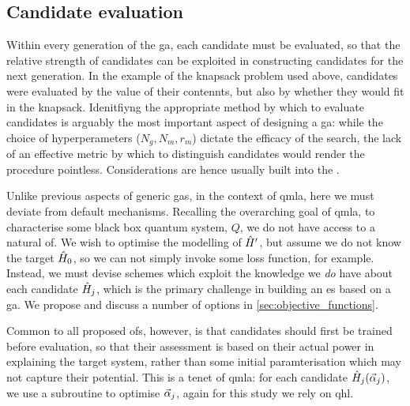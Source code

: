 \subsection{Candidate evaluation}
\label{sec:candidate_evaluation}
Within every generation of the \gls{ga}, each candidate must be evaluated, 
    so that the relative strength of candidates can be exploited in constructing 
    candidates for the next generation.
In the example of the knapsack problem used above, candidates were evaluated by the value of their contennts, 
    but also by whether they would fit in the knapsack. 
Idenitfiyng the appropriate method by which to evaluate candidates is arguably the most important aspect of designing a \gls{ga}:
    while the choice of hyperperameters ($N_g, N_m, r_m$) dictate the efficacy of the search, 
    the lack of an effective metric by which to distinguish candidates would render the procedure pointless.
Considerations are hence usually built into the . 
\par 
Unlike previous aspects of generic \glspl{ga}, in the context of \gls{qmla}, here we must deviate from default mechanisms. 
Recalling the overarching goal of \gls{qmla}, to characterise some black box quantum system, $Q$, we do not have access to a natural \gls{of}.
We wish to optimise the modelling of $\hat{H}^{\prime}$, but assume we do not know the target $\hat{H}_0$, 
    so we can not simply invoke some loss function, for example. 
Instead, we must devise schemes which exploit the knowledge we \emph{do} have about each candidate $\hat{H}_j$, 
    which is the primary challenge in building an \gls{es} based on a \gls{ga}.  
We propose and discuss a number of options in \cref{sec:objective_functions}. 
\par 

Common to all proposed \glspl{of}, however, is that candidates should first be trained before evaluation, 
    so that their assessment is based on their actual power in explaining the target system, 
    rather than some initial paramterisation which may not capture their potential. 
This is a tenet of \gls{qmla}: for each candidate $\hat{H}_j ( \vec{\alpha}_j )$, we use a subroutine to optimise $\vec{\alpha}_j$, 
    again for this study we rely on \gls{qhl}. 


